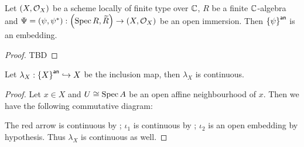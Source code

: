 \begin{lemma}\label{thm:open-immersion-induced-embedding-complex-topology}
	Let $\left(X, \mathcal{O}_{X}\right)$ be a scheme locally of finite type over $\mathbb{C}$, $R$ be a finite $\mathbb{C}$-algebra and $\Psi = (\psi, \psi^{*}) : \left(\operatorname*{Spec}{R}, \widetilde{R}\right) \to \left(X, \mathcal{O}_{X}\right)$ be an open immersion. Then ${\left\{{\psi}\right\}}^{\mathsf{an}}$ is an embedding.
\end{lemma}

\begin{proof}
	TBD
\end{proof}

\begin{lemma}\label{thm:continuous-inclusion-complex-topology}
	Let $\lambda_{X} : {\left\{{X}\right\}}^{\mathsf{an}} \hookrightarrow X$ be the inclusion map, then $\lambda_{X}$ is continuous.
\end{lemma}
\begin{proof}
	Let $x \in X$ and $U \cong \operatorname{Spec} A$ be an open affine neighbourhood of $x$. Then we have the following commutative diagram:
	\begin{center}
	\end{center}
	The red arrow is continuous by ; $\iota_{1}$ is continuous by ; $\iota_{2}$ is an open embedding by hypothesis. Thus $\lambda_{X}$ is continuous as well.
\end{proof}

